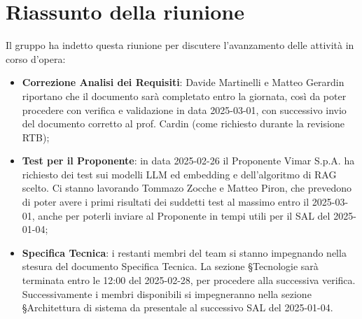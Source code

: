 \section{Riassunto della riunione}
Il gruppo ha indetto questa riunione per discutere l'avanzamento delle attività in corso d'opera:
\begin{itemize}
    \item \textbf{Correzione Analisi dei Requisiti}: Davide Martinelli e Matteo Gerardin riportano che il documento sarà completato entro la giornata, così da poter procedere con verifica e validazione in data 2025-03-01, con successivo invio del documento corretto al prof. Cardin (come richiesto durante la revisione RTB);
    \item \textbf{Test per il Proponente}: in data 2025-02-26 il Proponente Vimar S.p.A. ha richiesto dei test sui modelli LLM ed embedding e dell'algoritmo di RAG scelto. Ci stanno lavorando Tommazo Zocche e Matteo Piron, che prevedono di poter avere i primi risultati dei suddetti test al massimo entro il 2025-03-01, anche per poterli inviare al Proponente in tempi utili per il SAL del 2025-01-04;
    \item \textbf{Specifica Tecnica}: i restanti membri del team si stanno impegnando nella stesura del documento Specifica Tecnica. La sezione §Tecnologie sarà terminata entro le 12:00 del 2025-02-28, per procedere alla successiva verifica. Successivamente i membri disponibili si impegneranno nella sezione §Architettura di sistema da presentale al successivo SAL del 2025-01-04.

\end{itemize}